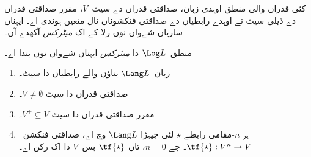 \documentclass[../../../include/open-logic-section]{subfiles}
\begin{document}


کئی قدراں والی منطق اوہدی زبان، صداقتی قدراں دے سیٹ~$V$،
مقرر صداقتی قدراں دے ذیلی سیٹ تے اوہدے رابطیاں دے صداقتی
فنکشوناں نال متعین ہوندی اے۔ ایہناں ساریاں شےواں نوں رلا کے
اک \emph{میٹرکس} آکھدے آں۔

\begin{defn}
منطق~$\Log L$ دا \emph{میٹرکس} ایہناں شےواں توں بندا اے۔
\begin{enumerate}
\item زبان~$\Lang L$ بناؤن والے رابطیاں دا سیٹ۔
\item صداقتی قدراں دا سیٹ $V \neq \emptyset$۔
\item مقرر صداقتی قدراں دا سیٹ $V^+ \subseteq V$۔
\item ہر $n$-مقامی رابطے $\star$ لئی جیہڑا $\Lang L$ وچ اے، صداقتی
فنکشن~$\tf{\star} : V^n \to V$۔ جے $n = 0$، تاں
$\tf{\star}$ بس~$V$ دا اک رکن اے۔
\end{enumerate}
\end{defn}
\end{document}
